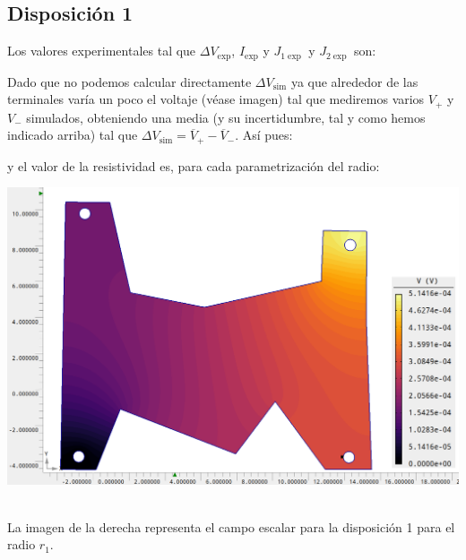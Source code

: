 \documentclass[11pt]{article}
\newcommand{\simu}{\text{sim}}
\begin{document}
\subsection{Disposición 1}


Los valores experimentales tal que $\Delta V_{\exp}$, $I_{\exp}$ y $J_{1\exp}$  y $J_{2\exp}$ son:


Dado que no podemos calcular directamente $\Delta V_{\simu}$ ya que alrededor de las terminales varía un poco el voltaje (véase imagen) tal que mediremos varios $V_+$ y $V_-$ simulados, obteniendo una media (y su incertidumbre, tal y como hemos indicado arriba) tal que $\Delta V_{\simu} = \overline{V}_+ - \overline{V}_{-} $. Así pues: 



y el valor de la resistividad es, para cada parametrización del radio: \\[1em]
\begin{minipage}[t]{0.45\linewidth} 
	\begin{center}
	\vspace{0.5em}
	
	\vspace{1.2em}
	\vspace{0.5em}
	
	\end{center}  
\end{minipage}
\hfill
\begin{minipage}[t]{0.45\linewidth}
	\begin{center}
	\includegraphics[width=1\linewidth]{Imagen Agros 1/Agros1.png}
	\end{center}  	
\end{minipage} \\[2em]
La imagen de la derecha representa el campo escalar para la disposición 1 para el radio $r_1$. 
\end{document}

